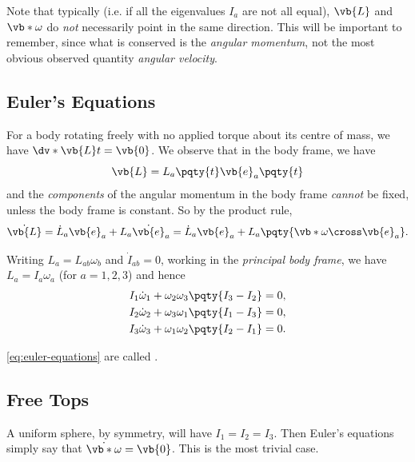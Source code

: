 Note that typically (i.e. if all the eigenvalues \(I_a\) are not all equal), \(\vb{L}\) and \(\vb*{\omega}\) do \emph{not} necessarily point in the same direction. This will be important to remember, since what is conserved is the \emph{angular momentum}, not the most obvious observed quantity \emph{angular velocity}.

\subsection{Euler's Equations}

For a body rotating freely with no applied torque about its centre of mass, we have \(\dv*{\vb{L}}{t} = \vb{0}\). We observe that in the body frame, we have
\begin{equation}
    \vb{L} = L_a \pqty{t} \vb{e}_a \pqty{t}
\end{equation}
and the \emph{components} of the angular momentum in the body frame \emph{cannot} be fixed, unless the body frame is constant. So by the product rule,
\begin{equation}
    \dot{\vb{L}} = \dot{L}_a \vb{e}_a + L_a \dot{\vb{e}}_a = \dot{L}_a \vb{e}_a + L_a \pqty{\vb*{\omega} \cross \vb{e}_a}.
\end{equation}

Writing \(L_a = L_{ab} \omega_b\) and \(\dot{I}_{ab} = 0\), working in the \emph{principal body frame}, we have \(L_a = I_a \omega_a\) (for \(a = 1, 2, 3\)) and hence
\begin{subequations}
    \label{eq:euler-equations}%
    \begin{align}
        I_1 \dot{\omega}_1 + \omega_2 \omega_3 \pqty{I_3 - I_2} &= 0, \\
        I_2 \dot{\omega}_2 + \omega_3 \omega_1 \pqty{I_1 - I_3} &= 0, \\
        I_3 \dot{\omega}_3 + \omega_1 \omega_2 \pqty{I_2 - I_1} &= 0.
    \end{align}
\end{subequations}

\eqref{eq:euler-equations} are called .

\subsection{Free Tops}

A uniform sphere, by symmetry, will have \(I_1 = I_2 = I_3\). Then Euler's equations simply say that \(\dot{\vb*{\omega}} = \vb{0}\). This is the most trivial case.

